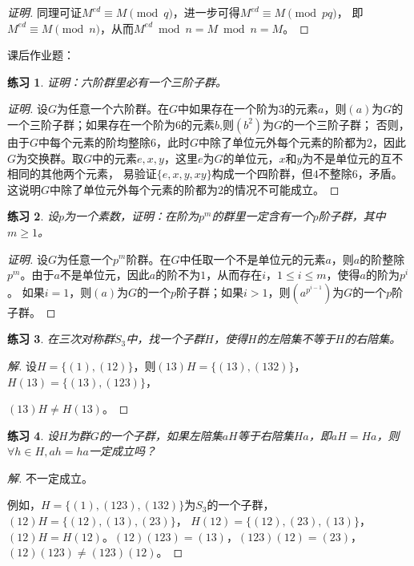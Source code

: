 \documentclass{article}
\newtheorem{Exercise}{练习}
\begin{document}
\begin{CJK*}{UTF8}{gbsn}
\begin{proof}[证明]
同理可证$M^{ed}\equiv M \pmod q$，进一步可得$M^{ed}\equiv M \pmod{pq}$，
即$M^{ed}\equiv M \pmod n$，从而$M^{ed} \bmod n = M\bmod n=M$。
\end{proof}

课后作业题：
\begin{Exercise}
证明：六阶群里必有一个三阶子群。
\end{Exercise}
\begin{proof}[证明]
  设$G$为任意一个六阶群。在$G$中如果存在一个阶为$3$的元素$a$，则$(a)$为$G$的一个三阶子群；如果存在一个阶为$6$的元素$b$,则$(b^2)$为$G$的一个三阶子群；
否则，由于$G$中每个元素的阶均整除$6$，此时$G$中除了单位元外每个元素的阶都为$2$，因此$G$为交换群。取$G$中的元素$e,x,y$，这里$e$为$G$的单位元，$x$和$y$为不是单位元的互不相同的其他两个元素，
易验证$\{e,x,y,xy\}$构成一个四阶群，但$4$不整除$6$，矛盾。这说明$G$中除了单位元外每个元素的阶都为$2$的情况不可能成立。
\end{proof}
\begin{Exercise}
设$p$为一个素数，证明：在阶为$p^m$的群里一定含有一个$p$阶子群，其中$m\geq 1$。
\end{Exercise}
\begin{proof}[证明]
  设$G$为任意一个$p^m$阶群。在$G$中任取一个不是单位元的元素$a$，则$a$的阶整除$p^m$。由于$a$不是单位元，因此$a$的阶不为$1$，从而存在$i$，$1\leq i\leq m$，使得$a$的阶为$p^i$。
  如果$i=1$，则$(a)$为$G$的一个$p$阶子群；如果$i>1$，则$(a^{p^{i-1}})$为$G$的一个$p$阶子群。
\end{proof}
\begin{Exercise}
在三次对称群$S_3$中，找一个子群$H$，使得$H$的左陪集不等于$H$的右陪集。
\end{Exercise}
\begin{proof}[解]
  设$H=\{(1),(12)\}$，则$(13)H=\{(13),(132)\}$，$H(13)=\{(13),(123)\}$， 
  
  $(13)H\neq H(13)$。
\end{proof}
\begin{Exercise}
设$H$为群$G$的一个子群，如果左陪集$aH$等于右陪集$Ha$，即$aH=Ha$，则$\forall h\in H, ah=ha$一定成立吗？
\end{Exercise}
\begin{proof}[解]
  不一定成立。

  例如，$H=\{(1),(123),(132)\}$为$S_3$的一个子群，$(12)H=\{(12),(13),(23)\}$，
  $H(12)=\{(12),(23),(13)\}$，$(12)H=H(12)$。$(12)(123)=(13)$，$(123)(12)=(23)$，$(12)(123)\neq (123)(12)$。
\end{proof}
\end{CJK*}
\end{document}
